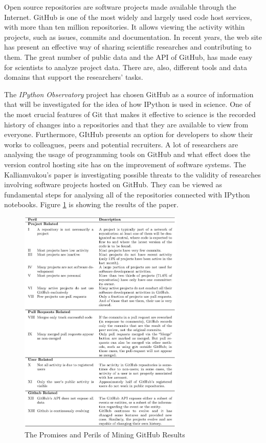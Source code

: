Open source repositories are software projects made available through the Internet.\cite{ossWiki}
GitHub is one of the most widely and largely used code host services, with more than ten million repositories.\cite{gitHubWiki}\cite{kalliamvakoupromises} It allows viewing the activity within projects, such as issues, commits and documentation. In recent years, the web site has present an effective way of sharing scientific researches and contributing to them. The great number of public data and the API of GitHub, has made easy for scientists to analyze project data. There are, also, different tools and data domains that support the researchers' tasks.\cite{gandrud2013github}

The \textit{IPython Observatory} project has chosen GitHub as a source of information that will be investigated for the idea of how IPython is used in science. One of the most crucial features of Git that makes it effective to science is the recorded history of changes into a repositories and that they are available to view from everyone\cite{ram2013git}. Furthermore, GItHub presents an option for developers to show their works to colleagues, peers and potential recruiters. A lot of researchers are analysing the usage of programming tools on GitHub and what effect does the version control hosting site has on the improvement of software systems. The Kalliamvakou's paper \cite{kalliamvakoupromises} is investigating possible threats to the validity of researches involving software projects hosted on GitHub. They can be viewed as fundamental steps for analysing all of the repositories connected with IPython notebooks. Figure \ref{fig:perils} is showing the results of the paper. 

\begin{figure}
\centering
\includegraphics[width=0.7\textwidth]{images/file-page1}
\caption{The Promises and Perils of Mining GitHub Results}
\label{fig:perils}
\end{figure}